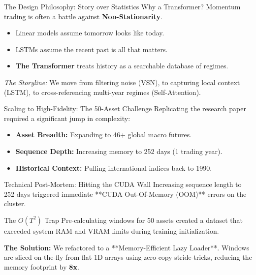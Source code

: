 
\begin{frame}{The Design Philosophy: Story over Statistics}
    Why a Transformer? Momentum trading is often a battle against \textbf{Non-Stationarity}.
    \begin{itemize}
        \item Linear models assume tomorrow looks like today.
        \item LSTMs assume the recent past is all that matters.
        \item \textbf{The Transformer} treats history as a searchable database of regimes.
    \end{itemize}
    \textit{The Storyline:} We move from filtering noise (VSN), to capturing local context (LSTM), to cross-referencing multi-year regimes (Self-Attention).
\end{frame}

\begin{frame}{Scaling to High-Fidelity: The 50-Asset Challenge}
    Replicating the research paper required a significant jump in complexity:
    \begin{itemize}
        \item \textbf{Asset Breadth:} Expanding to 46+ global macro futures.
        \item \textbf{Sequence Depth:} Increasing memory to 252 days (1 trading year).
        \item \textbf{Historical Context:} Pulling international indices back to 1990.
    \end{itemize}
\end{frame}

\begin{frame}{Technical Post-Mortem: Hitting the CUDA Wall}
    Increasing sequence length to 252 days triggered immediate **CUDA Out-Of-Memory (OOM)** errors on the cluster.
    \begin{alertblock}{The $O(T^2)$ Trap}
        Pre-calculating windows for 50 assets created a dataset that exceeded system RAM and VRAM limits during training initialization.
    \end{alertblock}
    \textbf{The Solution:} We refactored to a **Memory-Efficient Lazy Loader**. Windows are sliced on-the-fly from flat 1D arrays using zero-copy stride-tricks, reducing the memory footprint by \textbf{8x}.
\end{frame}

